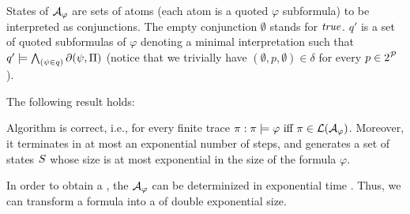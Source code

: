  States of $\mathcal{A}_\varphi$ are sets of atoms (each atom is a quoted $\varphi$ subformula) to be interpreted as conjunctions. The empty conjunction $\emptyset$ stands for $\mathit{true}$. $q'$ is a set of quoted subformulas of $\varphi$ denoting a minimal interpretation such that $q' \models \bigwedge_{(\psi\in q)} \partial\lparen \psi,\Pi \rparen$ (notice that we trivially have $(\emptyset, p,\emptyset) \in \delta$ for every $p \in 2^{\mathcal{P}}$).

The following result holds:
\begin{theorem}\label{ldlf2nfa-correctness}
	Algorithm \LDLfToNFA is correct, i.e., for every finite trace $\pi: \pi \models \varphi \ \text{iff}\  \pi \in \mathcal{L}(\mathcal{A}_\varphi)$. Moreover, it terminates in at most an exponential number of steps, and generates a set of states $S$ whose size is at most exponential in the size of the formula $\varphi$.
	
\end{theorem}

In order to obtain a \DFA, the \NFA $\mathcal{A}_\varphi$ can be determinized in exponential time \citep{Rabin:1959:FAD:1661907.1661909}. Thus, we can transform a \LLf formula into a \DFA of double exponential size.

